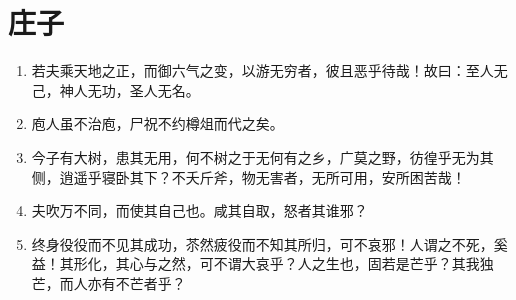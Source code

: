 \documentclass[UTF8]{ctexart}
\begin{document}
	\newpage
	
	\section{庄子}
		\begin{enumerate}
			\item 若夫乘天地之正，而御六气之变，以游无穷者，彼且恶乎待哉！故曰：至人无己，神人无功，圣人无名。
			\item 庖人虽不治庖，尸祝不约樽俎而代之矣。
			\item 今子有大树，患其无用，何不树之于无何有之乡，广莫之野，彷徨乎无为其侧，逍遥乎寝卧其下？不夭斤斧，物无害者，无所可用，安所困苦哉！
			\item 夫吹万不同，而使其自己也。咸其自取，怒者其谁邪？
			\item 终身役役而不见其成功，苶然疲役而不知其所归，可不哀邪！人谓之不死，奚益！其形化，其心与之然，可不谓大哀乎？人之生也，固若是芒乎？其我独芒，而人亦有不芒者乎？
		\end{enumerate}
	
	\newpage
	
\end{document}
